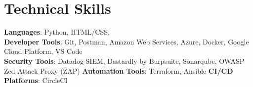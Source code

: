 \documentclass[letterpaper,11pt]{article}
\begin{document}
%
\section{Technical Skills}
 \begin{itemize}[leftmargin=0.15in, label={}]
    \small{\item{
     \textbf{Languages}{: Python, HTML/CSS,} \\
     \textbf{Developer Tools}{: Git, Postman, Amazon Web Services, Azure, Docker, Google Cloud Platform, VS Code } \\
     \textbf{Security Tools}{: Datadog SIEM, Dastardly by Burpsuite, Sonarqube, OWASP Zed Attack Proxy (ZAP) }
     \textbf{Automation Tools}{: Terraform, Ansible }
     \textbf{CI/CD Platforms}{: CircleCI}

    }}
 \end{itemize}


\end{document}
